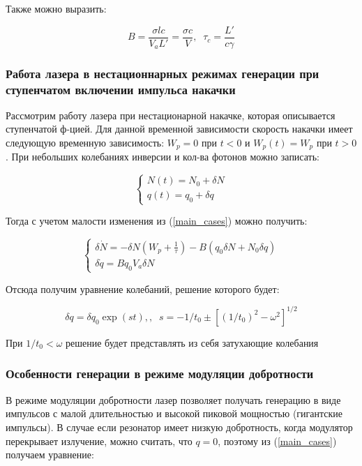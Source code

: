 \documentclass[a4paper]{article}
\begin{document}
Также можно выразить:

\begin{equation}
	B = \frac{\sigma l c}{V_a L'} = \frac{\sigma c}{V}, \; \; \tau_c = \frac{L'}{c \gamma}
\end{equation}

\subsubsection{Работа лазера в нестационнарных режимах генерации при ступенчатом включении импульса накачки}

Рассмотрим работу лазера при нестационарной накачке, которая описывается ступенчатой ф-цией. Для данной временной зависимости скорость накачки имеет следующую временную зависимость: $W_p = 0$ при $t < 0$ и $W_p(t) = W_p$ при $t>0$. При небольших колебаниях инверсии и кол-ва фотонов можно записать:

\begin{equation}
	\begin{cases}
		N(t) = N_0 + \delta N \\
		q(t) = q_0 + \delta q
	\end{cases}
\end{equation}

Тогда с учетом малости изменения из (\ref{main_cases}) можно получить:

\begin{equation}
	\begin{cases}
		\delta \dot{N} = - \delta N(W_p + \frac{1}{\tau}) - B(q_0 \delta N + N_0 \delta q) \\
		\delta \dot{q} = Bq_0 V_a \delta N
	\end{cases}
\end{equation}

Отсюда получим уравнение колебаний, решение которого будет:

\begin{equation}
	\delta q = \delta q_0 \exp(st),, \; \; s = -1/t_0 \pm[(1/t_0)^2 - \omega^2]^{1/2}
\end{equation}

При $1/t_0 < \omega$ решение будет представлять из себя затухающие колебания

\subsubsection{Особенности генерации в режиме модуляции добротности}

В режиме модуляции добротности лазер позволяет получать генерацию в виде импульсов с малой длительностью и высокой пиковой мощностью (гигантские импульсы). В случае если резонатор имеет низкую добротность, когда модулятор перекрывает излучение, можно считать, что $q = 0$, поэтому из (\ref{main_cases}) получаем уравнение:
\end{document}
